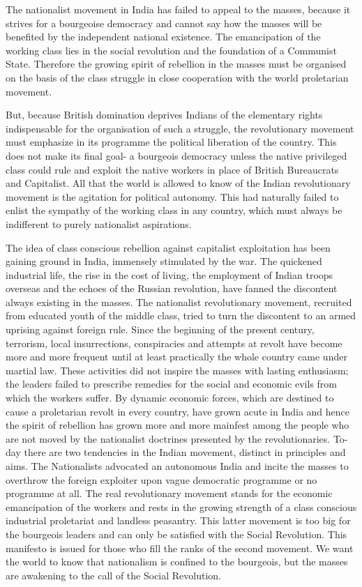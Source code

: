 The nationalist movement in India has failed to appeal to the masses, because it strives for a bourgeoise democracy and cannot say how the masses will be benefited by the independent national existence. The emancipation of the working class lies in the social revolution and the foundation of a Communist State. Therefore the growing spirit of rebellion in the masses must be organised on the basis of the class struggle in close cooperation with the world proletarian movement.

But, because British domination deprives Indians of the elementary rights indispensable for the organisation of such a struggle, the revolutionary movement must emphasize in its programme the political liberation of the country. This does not make its final goal- a bourgeois democracy unless the native privileged class could rule and exploit the native workers in place of British Bureaucrats and Capitalist. All that the world is allowed to know of the Indian revolutionary movement is the agitation for political autonomy. This had naturally failed to enlist the sympathy of the working class in any country, which must always be indifferent to purely nationalist aspirations. 

The idea of class conscious rebellion against capitalist exploitation has been gaining ground in India, immensely stimulated by the war. The quickened industrial life, the rise in the cost of living, the employment of Indian troops overseas and the echoes of the Russian revolution, have fanned the discontent always existing in the masses. The nationalist revolutionary movement, recruited from educated youth of the middle class, tried to turn the discontent to an armed uprising against foreign rule. Since the beginning of the present century, terrorism, local insurrections, conspiracies and attempts at revolt have become more and more frequent until at least practically the whole country came under martial law. These activities did not inspire the masses with lasting enthusiasm; the leaders failed to prescribe remedies for the social and economic evils from which the workers suffer. By dynamic economic forces, which are destined to cause a proletarian revolt in every country, have grown acute in India and hence the spirit of rebellion has grown more and more mainfest among the people who are not moved by the nationalist doctrines presented by the revolutionaries. To-day there are two tendencies in the Indian movement, distinct in principles and aims. The Nationalists advocated an autonomous India and incite the masses to overthrow the foreign exploiter upon vague democratic programme or no programme at all. The real revolutionary movement stands for the economic emancipation of the workers and rests in the growing strength of a class conscious industrial proletariat and landless peasantry. This latter movement is too big for the bourgeois leaders and can only be satisfied with the Social Revolution. This manifesto is issued for those who fill the ranks of the second movement. We want the world to know that nationalism is confined to the bourgeois, but the masses are awakening to the call of the Social Revolution. 

